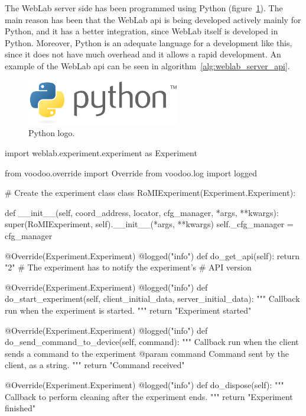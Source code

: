 The WebLab server side has been programmed using Python (figure~\ref{fig:python}). The main reason
has been that the WebLab \acrshort{api} is being developed actively mainly for Python, and it has
a better integration, since WebLab itself is developed in Python. Moreover, Python is an adequate
language for a development like this, since it does not have much overhead and it allows a rapid
development. An example of the WebLab \acrshort{api} can be seen in
algorithm~\ref{alg:weblab_server_api}.

\begin{figure}[!htbp]
	\centering
	\includegraphics[width=0.6\textwidth]{fig/python}
	\caption{Python logo.}
	\label{fig:python}
\end{figure}

\clearpage
\begin{center}
\begin{minipage}{.9\textwidth}
\singlespace
{}
\begin{pyglist}[language=python, caption={WebLab experiment server development.},
	label={alg:weblab_server_api}, listingname={Algorithm}, numbers=left]
import weblab.experiment.experiment as Experiment

from voodoo.override import Override
from voodoo.log import logged

# Create the experiment class
class RoMIExperiment(Experiment.Experiment):

    def __init__(self, coord_address, locator, cfg_manager,
    *args, **kwargs):
        super(RoMIExperiment, self).__init__(*args, **kwargs)
        self._cfg_manager = cfg_manager

    @Override(Experiment.Experiment)
    @logged("info")
    def do_get_api(self):
        return "2" # The experiment has to notify the experiment's
                   # API version

    @Override(Experiment.Experiment)
    @logged("info")
    def do_start_experiment(self, client_initial_data,
    server_initial_data):
        """
        Callback run when the experiment is started.
        """
        return "Experiment started"

    @Override(Experiment.Experiment)
    @logged("info")
    def do_send_command_to_device(self, command):
        """
        Callback run when the client sends a command to the experiment
        @param command Command sent by the client, as a string.
        """
        return "Command received"

    @Override(Experiment.Experiment)
    @logged("info")
    def do_dispose(self):
        """
        Callback to perform cleaning after the experiment ends.
        """
        return "Experiment finished"
\end{pyglist}
\end{minipage}
\end{center}
\clearpage

